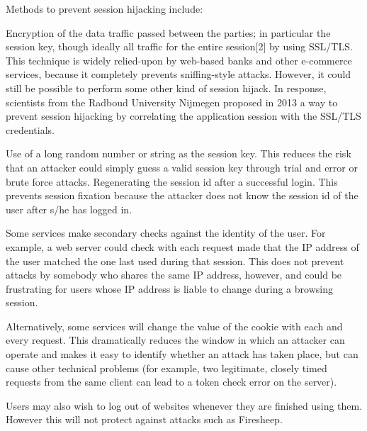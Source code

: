 Methods to prevent session hijacking include:

\begin{compactitem}
\item Encryption of the data traffic passed between the parties; in particular the session key, though ideally all traffic for the entire session[2] by using SSL/TLS. This technique is widely relied-upon by web-based banks and other e-commerce services, because it completely prevents sniffing-style attacks. However, it could still be possible to perform some other kind of session hijack. In response, scientists from the Radboud University Nijmegen proposed in 2013 a way to prevent session hijacking by correlating the application session with the SSL/TLS credentials.

\item Use of a long random number or string as the session key. This reduces the risk that an attacker could simply guess a valid session key through trial and error or brute force attacks.
Regenerating the session id after a successful login. This prevents session fixation because the attacker does not know the session id of the user after s/he has logged in.

\item Some services make secondary checks against the identity of the user. For example, a web server could check with each request made that the IP address of the user matched the one last used during that session. This does not prevent attacks by somebody who shares the same IP address, however, and could be frustrating for users whose IP address is liable to change during a browsing session.

\item Alternatively, some services will change the value of the cookie with each and every request. This dramatically reduces the window in which an attacker can operate and makes it easy to identify whether an attack has taken place, but can cause other technical problems (for example, two legitimate, closely timed requests from the same client can lead to a token check error on the server).

\item Users may also wish to log out of websites whenever they are finished using them. However this will not protect against attacks such as Firesheep.

\end{compactitem}





